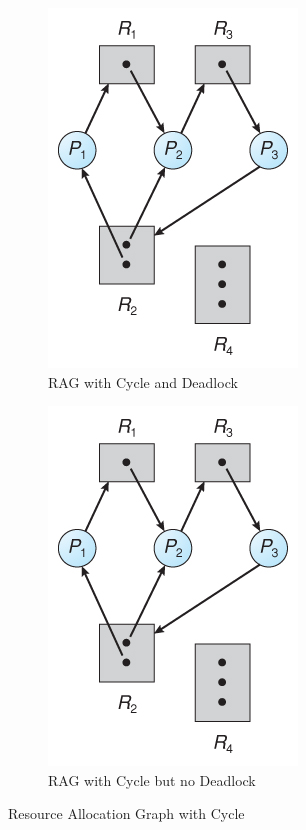 \begin{figure}[h!tbp]
  \centering
  \begin{subfigure}[h!tbp]{0.48\linewidth}
    \centering
    \includegraphics[scale=0.85]{./Drawings/EDAF35-Operating_Systems/Resource_Allocation_Graph-Deadlock.jpg}
    \caption{RAG with Cycle and Deadlock}
    \label{subfig:Resource_Allocation_Graph-Cycle_Deadlock}
  \end{subfigure}
  \begin{subfigure}[h!tbp]{0.48\linewidth}
    \centering
    \includegraphics[scale=0.85]{./Drawings/EDAF35-Operating_Systems/Resource_Allocation_Graph-Cycle_No_Deadlock.jpg}
    \caption{RAG with Cycle but no Deadlock}
    \label{subfig:Resource_Allocation_Graph-Cycle_No_Deadlock}
  \end{subfigure}
  \caption{Resource Allocation Graph with Cycle}
  \label{fig:Resource_Allocation_Graph-Cycle}
\end{figure}

